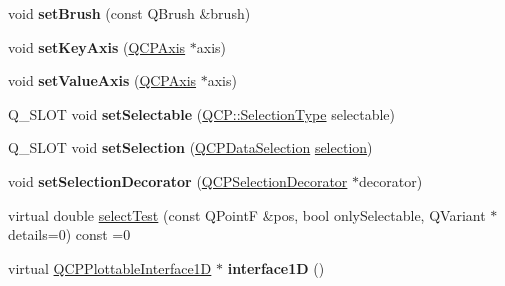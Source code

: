 \begin{DoxyCompactItemize}
\item 
\mbox{\label{class_q_c_p_abstract_plottable_a7a4b92144dca6453a1f0f210e27edc74}} 
void {\bfseries set\+Brush} (const Q\+Brush \&brush)
\item 
\mbox{\label{class_q_c_p_abstract_plottable_a8524fa2994c63c0913ebd9bb2ffa3920}} 
void {\bfseries set\+Key\+Axis} (\hyperlink{class_q_c_p_axis}{Q\+C\+P\+Axis} $\ast$axis)
\item 
\mbox{\label{class_q_c_p_abstract_plottable_a71626a07367e241ec62ad2c34baf21cb}} 
void {\bfseries set\+Value\+Axis} (\hyperlink{class_q_c_p_axis}{Q\+C\+P\+Axis} $\ast$axis)
\item 
\mbox{\label{class_q_c_p_abstract_plottable_a068d169679b7088d28aa3ba5e663dd8c}} 
Q\+\_\+\+S\+L\+OT void {\bfseries set\+Selectable} (\hyperlink{namespace_q_c_p_ac6cb9db26a564b27feda362a438db038}{Q\+C\+P\+::\+Selection\+Type} selectable)
\item 
\mbox{\label{class_q_c_p_abstract_plottable_a8b94acee63e2c9c0284164f25d44fd0d}} 
Q\+\_\+\+S\+L\+OT void {\bfseries set\+Selection} (\hyperlink{class_q_c_p_data_selection}{Q\+C\+P\+Data\+Selection} \hyperlink{class_q_c_p_abstract_plottable_a040bf09f41d456284cfd39cc37aa068f}{selection})
\item 
\mbox{\label{class_q_c_p_abstract_plottable_a20e266ad646f8c4a7e4631040510e5d9}} 
void {\bfseries set\+Selection\+Decorator} (\hyperlink{class_q_c_p_selection_decorator}{Q\+C\+P\+Selection\+Decorator} $\ast$decorator)
\item 
virtual double \hyperlink{class_q_c_p_abstract_plottable_a38efe9641d972992a3d44204bc80ec1d}{select\+Test} (const Q\+PointF \&pos, bool only\+Selectable, Q\+Variant $\ast$details=0) const =0
\item 
\mbox{\label{class_q_c_p_abstract_plottable_af283378dacd1b247bf557f46a9144686}} 
virtual \hyperlink{class_q_c_p_plottable_interface1_d}{Q\+C\+P\+Plottable\+Interface1D} $\ast$ {\bfseries interface1D} ()
\item 
\mbox{\label{class_q_c_p_abstract_plottable_a56b4d9000f4de0de86c566c84eb05a21}} 

\end{DoxyCompactItemize}

